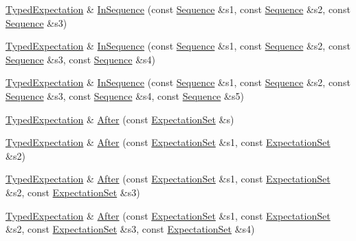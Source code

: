 \begin{DoxyCompactItemize}
\hyperlink{classtesting_1_1internal_1_1TypedExpectation}{Typed\+Expectation} \& \hyperlink{classtesting_1_1internal_1_1TypedExpectation_a17cfbb9db111e0ded254759664e78d73}{In\+Sequence} (const \hyperlink{classtesting_1_1Sequence}{Sequence} \&s1, const \hyperlink{classtesting_1_1Sequence}{Sequence} \&s2, const \hyperlink{classtesting_1_1Sequence}{Sequence} \&s3)
\item 
\hyperlink{classtesting_1_1internal_1_1TypedExpectation}{Typed\+Expectation} \& \hyperlink{classtesting_1_1internal_1_1TypedExpectation_aa60bae1cf536651dc5efcd8110bea4fd}{In\+Sequence} (const \hyperlink{classtesting_1_1Sequence}{Sequence} \&s1, const \hyperlink{classtesting_1_1Sequence}{Sequence} \&s2, const \hyperlink{classtesting_1_1Sequence}{Sequence} \&s3, const \hyperlink{classtesting_1_1Sequence}{Sequence} \&s4)
\item 
\hyperlink{classtesting_1_1internal_1_1TypedExpectation}{Typed\+Expectation} \& \hyperlink{classtesting_1_1internal_1_1TypedExpectation_ad8775f8ba9965d1836f6e4c09baf1c3e}{In\+Sequence} (const \hyperlink{classtesting_1_1Sequence}{Sequence} \&s1, const \hyperlink{classtesting_1_1Sequence}{Sequence} \&s2, const \hyperlink{classtesting_1_1Sequence}{Sequence} \&s3, const \hyperlink{classtesting_1_1Sequence}{Sequence} \&s4, const \hyperlink{classtesting_1_1Sequence}{Sequence} \&s5)
\item 
\hyperlink{classtesting_1_1internal_1_1TypedExpectation}{Typed\+Expectation} \& \hyperlink{classtesting_1_1internal_1_1TypedExpectation_a30f320d18ebf1a40e94883d7a56c6c8c}{After} (const \hyperlink{classtesting_1_1ExpectationSet}{Expectation\+Set} \&s)
\item 
\hyperlink{classtesting_1_1internal_1_1TypedExpectation}{Typed\+Expectation} \& \hyperlink{classtesting_1_1internal_1_1TypedExpectation_a8e272fc396e508a2e63b13be30f81f15}{After} (const \hyperlink{classtesting_1_1ExpectationSet}{Expectation\+Set} \&s1, const \hyperlink{classtesting_1_1ExpectationSet}{Expectation\+Set} \&s2)
\item 
\hyperlink{classtesting_1_1internal_1_1TypedExpectation}{Typed\+Expectation} \& \hyperlink{classtesting_1_1internal_1_1TypedExpectation_a95a341dd221901b5e51dd7cfdbdb3570}{After} (const \hyperlink{classtesting_1_1ExpectationSet}{Expectation\+Set} \&s1, const \hyperlink{classtesting_1_1ExpectationSet}{Expectation\+Set} \&s2, const \hyperlink{classtesting_1_1ExpectationSet}{Expectation\+Set} \&s3)
\item 
\hyperlink{classtesting_1_1internal_1_1TypedExpectation}{Typed\+Expectation} \& \hyperlink{classtesting_1_1internal_1_1TypedExpectation_a1749e368f659352ed8375512acafc178}{After} (const \hyperlink{classtesting_1_1ExpectationSet}{Expectation\+Set} \&s1, const \hyperlink{classtesting_1_1ExpectationSet}{Expectation\+Set} \&s2, const \hyperlink{classtesting_1_1ExpectationSet}{Expectation\+Set} \&s3, const \hyperlink{classtesting_1_1ExpectationSet}{Expectation\+Set} \&s4)

\end{DoxyCompactItemize}
